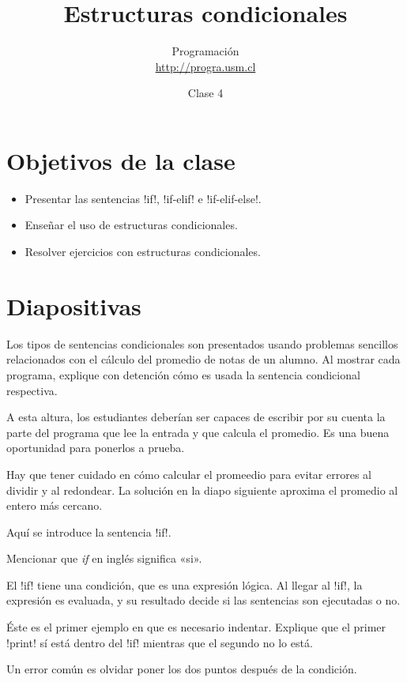\documentclass[10pt]{article}
\title{Estructuras condicionales}
\author{Programación \\ \url{http://progra.usm.cl}}
\date{Clase 4}
\begin{document}
  \maketitle

  \section*{Objetivos de la clase}
  \begin{itemize}
    \item Presentar las sentencias \li!if!, \li!if-elif! e \li!if-elif-else!.
    \item Enseñar el uso de estructuras condicionales.
    \item Resolver ejercicios con estructuras condicionales.
  \end{itemize}

  \section*{Diapositivas}

  Los tipos de sentencias condicionales
  son presentados usando problemas sencillos
  relacionados con el cálculo del promedio de notas de un alumno.
  Al mostrar cada programa,
  explique con detención cómo es usada la sentencia condicional respectiva.


  A esta altura, los estudiantes deberían ser capaces
  de escribir por su cuenta
  la parte del programa que lee la entrada y que calcula el promedio.
  Es una buena oportunidad para ponerlos a prueba.

  Hay que tener cuidado en cómo calcular el promeedio
  para evitar errores al dividir y al redondear.
  La solución en la diapo siguiente
  aproxima el promedio al entero más cercano.


  Aquí se introduce la sentencia \li!if!.

  Mencionar que \emph{if} en inglés significa «si».

  El \li!if! tiene una condición,
  que es una expresión lógica.
  Al llegar al \li!if!, la expresión es evaluada,
  y su resultado decide si las sentencias son ejecutadas o no.

  Éste es el primer ejemplo
  en que es necesario indentar.
  Explique que el primer \li!print! sí está dentro del \li!if!
  mientras que el segundo no lo está.

  Un error común es olvidar poner los dos puntos después de la condición.
\end{document}

